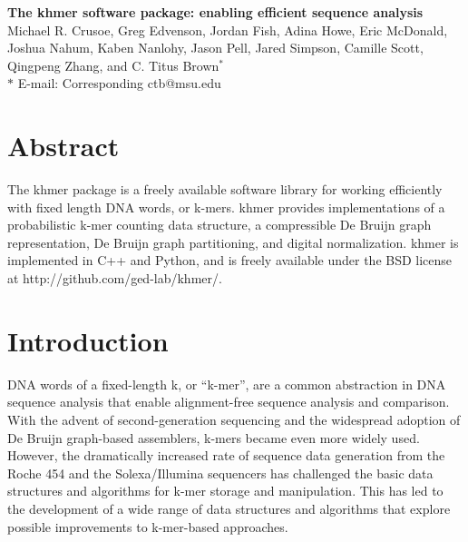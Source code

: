 \documentclass[10pt]{article}
\date{}
\begin{document}
\begin{flushleft}
{\Large
\textbf{The khmer software package: enabling efficient sequence analysis}
}
\\

Michael R. Crusoe, Greg Edvenson, Jordan Fish, Adina Howe, Eric McDonald, Joshua Nahum, Kaben Nanlohy, Jason Pell, Jared Simpson, Camille Scott, Qingpeng Zhang, and C. Titus Brown$^{\ast}$
\\
$\ast$ E-mail: Corresponding ctb@msu.edu
\end{flushleft}

\section*{Abstract}

The khmer package is a freely available software library for working
efficiently with fixed length DNA words, or k-mers.  khmer provides
implementations of a probabilistic k-mer counting data structure,
a compressible De Bruijn graph representation, De Bruijn graph
partitioning, and digital normalization.  khmer is implemented in C++
and Python, and is freely available under the BSD license at http://github.com/ged-lab/khmer/.


\section*{Introduction}

DNA words of a fixed-length k, or ``k-mer'', are a common abstraction
in DNA sequence analysis that enable alignment-free sequence analysis
and comparison. With the advent of second-generation
sequencing and the widespread adoption of De Bruijn graph-based
assemblers, k-mers became even more widely used.  However, the
dramatically increased rate of sequence data generation from the Roche
454 and the Solexa/Illumina sequencers has challenged the basic
data structures and algorithms for k-mer storage and manipulation.
This has led to the development of a wide range of data structures and
algorithms that explore possible improvements to k-mer-based
approaches.
\end{document}
